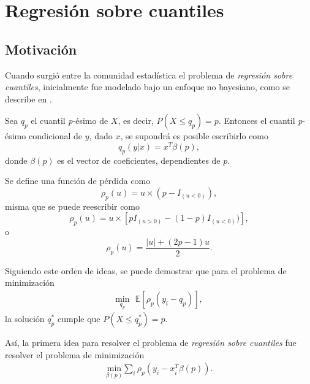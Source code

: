 \chapter{Regresi\'on sobre cuantiles}

\section{Motivaci\'on}

Cuando surgi\'o entre la comunidad estad\'istica el problema de \textit{regresi\'on sobre cuantiles}, inicialmente fue modelado bajo un enfoque no bayesiano, como se describe en \cite{Yu_BayQuantReg}. 

Sea $q_p$ el cuantil \textit{p}-\'esimo de $X$, es decir, $P(X \leq q_p) = p$. Entonces el cuantil \textit{p}-\'esimo condicional de $y$, dado $x$, se supondr\'a es posible escribirlo como
\begin{equation*}
    q_p(y|x) = x^T\beta(p), 
\end{equation*}
donde $\beta(p)$ es el vector de coeficientes, dependientes de $p$.

Se define una funci\'on de p\'erdida como 
\begin{equation*}
    \rho_p(u) = u \times (p - I_{(u<0)}),
\end{equation*}
misma que se puede reescribir como 
\begin{equation*}
    \rho_p(u) = u \times [pI_{(u>0)} - (1-p) I_{(u<0)})],
\end{equation*}
o
\begin{equation*}
    \rho_p(u) = 
    \frac{|u| + (2p-1)u}{2}.
\end{equation*}

Siguiendo este orden de ideas, se puede demostrar que para el problema de minimizaci\'on
\begin{equation*}
    \begin{aligned}
    \underset{q_p}{\text{min}} \text{ }
    \mathbb{E} [\rho_p(y_i - q_p)],
    \end{aligned}
\end{equation*}
la soluci\'on $q_p^*$ cumple que $P(X \leq q_p^*) = p$.

As\'i, la primera idea para resolver el problema de \textit{regresi\'on sobre cuantiles} fue resolver el problema de minimizaci\'on
\begin{equation*}
\begin{aligned}
\underset{\beta(p)}{\text{min}}
\sum_i \rho_p(y_i - x_i^T \beta(p)).
\end{aligned}
\end{equation*}

